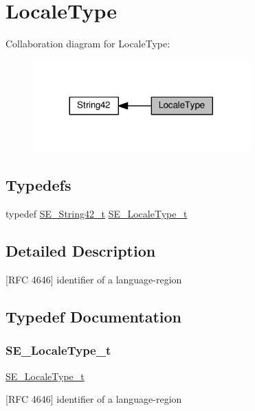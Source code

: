 \hypertarget{group__LocaleType}{}\section{Locale\+Type}
\label{group__LocaleType}
Collaboration diagram for Locale\+Type\+:\nopagebreak
\begin{figure}[H]
\begin{center}
\leavevmode
\includegraphics[width=236pt]{group__LocaleType}
\end{center}
\end{figure}
\subsection*{Typedefs}
\begin{DoxyCompactItemize}
\item 
typedef \hyperlink{group__String42_gad5a294b994fa3a024ca6d747f784f0d9}{S\+E\+\_\+\+String42\+\_\+t} \hyperlink{group__LocaleType_gafbd2b639ff2cebd36ad75759203ee20c}{S\+E\+\_\+\+Locale\+Type\+\_\+t}
\end{DoxyCompactItemize}


\subsection{Detailed Description}
\mbox{[}R\+FC 4646\mbox{]} identifier of a language-\/region 

\subsection{Typedef Documentation}
\mbox{\label{group__LocaleType_gafbd2b639ff2cebd36ad75759203ee20c}} 
\subsubsection{\texorpdfstring{S\+E\+\_\+\+Locale\+Type\+\_\+t}{SE\_LocaleType\_t}}
{\footnotesize\ttfamily \hyperlink{group__LocaleType_gafbd2b639ff2cebd36ad75759203ee20c}{S\+E\+\_\+\+Locale\+Type\+\_\+t}}

\mbox{[}R\+FC 4646\mbox{]} identifier of a language-\/region 